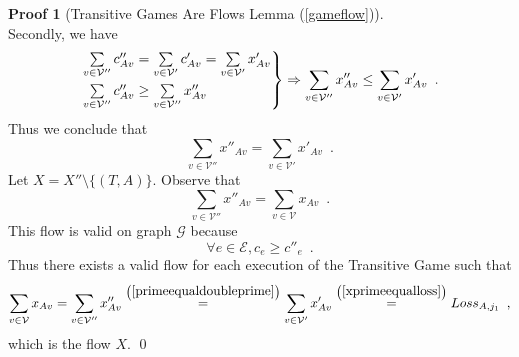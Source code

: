 \documentclass[11pt]{llncs}
\theoremstyle{definition}
\newtheorem{sepproof}{Proof}
\begin{document}
\begin{sepproof}[Transitive Games Are Flows Lemma (\ref{gameflow})]
\begin{equation*}
       \end{equation*}
       Secondly, we have
       \begin{equation*}
          \begin{rcases}
             \sum\limits_{v \in \mathcal{V}''}c''_{Av} = \sum\limits_{v \in \mathcal{V}'}c'_{Av} = \sum\limits_{v \in
             \mathcal{V}'}x'_{Av} \\
             \sum\limits_{v \in \mathcal{V}''}c''_{Av} \geq \sum\limits_{v \in \mathcal{V}''}x''_{Av}
          \end{rcases}
          \Rightarrow \sum\limits_{v \in \mathcal{V}''}x''_{Av} \leq \sum\limits_{v \in \mathcal{V}'}x'_{Av} \enspace.
       \end{equation*}
       Thus we conclude that
       \begin{equation}
       \label{primeequaldoubleprime}
          \sum\limits_{v \in \mathcal{V}''}x''_{Av} = \sum\limits_{v \in \mathcal{V}'}x'_{Av} \enspace.
       \end{equation}
       Let $X = X'' \setminus \{(T, A)\}$. Observe that
       \begin{equation*}
          \sum\limits_{v \in \mathcal{V}''}x''_{Av} = \sum\limits_{v \in \mathcal{V}}x_{Av} \enspace.
       \end{equation*}
       This flow is valid on graph $\mathcal{G}$ because
       \begin{equation*}
          \forall e \in \mathcal{E}, c_e \geq c''_e \enspace.
       \end{equation*}
       Thus there exists a valid flow for each execution of the Transitive Game such that
       \begin{equation*}
          \sum\limits_{v \in \mathcal{V}}x_{Av} = \sum\limits_{v \in \mathcal{V}''}x''_{Av}
          \overset{\left(\ref{primeequaldoubleprime}\right)}{=} \sum\limits_{v \in \mathcal{V}'}x'_{Av}
          \overset{\left(\ref{xprimeequalloss}\right)}{=} Loss_{A, j_1} \enspace,
       \end{equation*}
       which is the flow $X$. \qed
    \end{sepproof}
\end{document}
